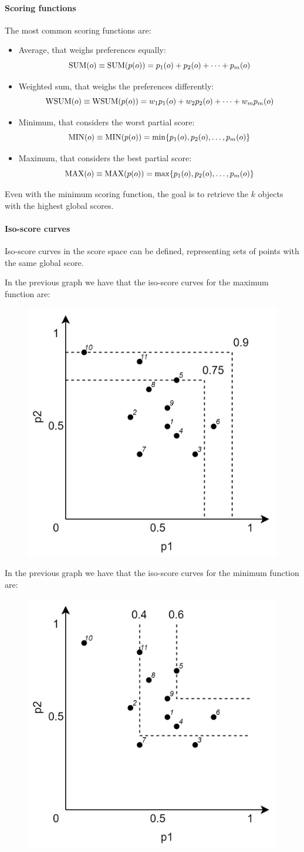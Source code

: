 \paragraph*{Scoring functions}
The most common scoring functions are: 
\begin{itemize}
    \item Average, that weighs preferences equally: 
        \[\textnormal{SUM}(o) \equiv \textnormal{SUM}(p(o)) = p_1(o) + p_2(o) + \dots + p_m(o)\]
    \item Weighted sum, that weighs the preferences differently:
        \[\textnormal{WSUM}(o) \equiv \textnormal{WSUM}(p(o)) = w_1p_1(o) + w_2p_2(o) + \dots + w_mp_m(o)\]
    \item Minimum, that considers the worst partial score: 
        \[\textnormal{MIN}(o) \equiv \textnormal{MIN}(p(o)) = \min\{p_1(o),p_2(o),\dots, p_m(o)\}\]
    \item Maximum, that considers the best partial score: 
        \[\textnormal{MAX}(o) \equiv \textnormal{MAX}(p(o)) = \max\{p_1(o),p_2(o),\dots, p_m(o)\}\]       
\end{itemize}
Even with the minimum scoring function, the goal is to retrieve the $k$ objects with the highest global scores.

\paragraph*{Iso-score curves}
Iso-score curves in the score space can be defined, representing sets of points with the same global score.
\begin{example}
    In the previous graph we have that the iso-score curves for the maximum function are: 
    \begin{figure}[H]
        \centering
        \includegraphics[width=0.35\linewidth]{images/iso.png}
    \end{figure}
    In the previous graph we have that the iso-score curves for the minimum function are: 
    \begin{figure}[H]
        \centering
        \includegraphics[width=0.35\linewidth]{images/isomin.png}
    \end{figure}
\end{example}

